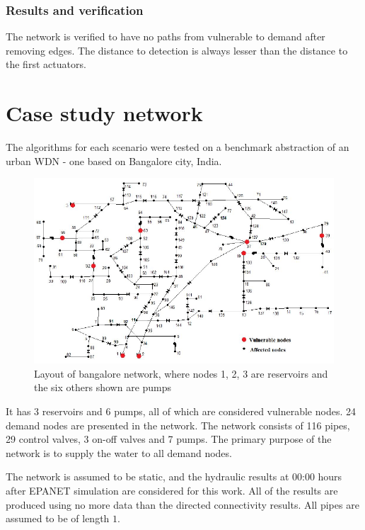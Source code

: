 \documentclass[authoryear,preprint,review,12pt]{elsarticle}
\begin{document}
\subsubsection{Results and verification}

The network is verified to have no paths from vulnerable to demand
after removing edges. The distance to detection is always lesser than
the distance to the first actuators.




\section{Case study network}

The algorithms for each scenario were tested on a benchmark abstraction of an urban WDN - one based on Bangalore city, India.
\begin{figure}[ht]
   \includegraphics[width=\linewidth]{images/bangalore_vuln_venkat}\caption{Layout of bangalore network, where nodes 1, 2, 3 are reservoirs and
the six others shown are pumps}
\end{figure}
It has 3 reservoirs and 6 pumps, all of which are considered vulnerable
nodes. 24 demand nodes are presented in the network. The network consists
of 116 pipes, 29 control valves, 3 on-off valves and 7 pumps. The
primary purpose of the network is to supply the water to all demand
nodes. %

The network is assumed to be static, and the hydraulic results at
00:00 hours after EPANET simulation are considered for this work.
All of the results are produced using no more data than the directed
connectivity results. All pipes are assumed to be of length $1$.
\end{document}
